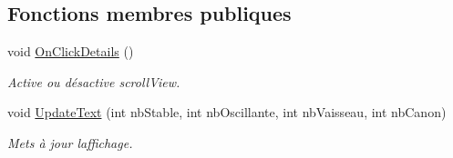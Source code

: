 \subsection*{Fonctions membres publiques}
\begin{DoxyCompactItemize}
\item 
void \mbox{\hyperlink{class_detection_u_i_a1436465c88d6abe37af82424bf3ae11b}{On\+Click\+Details}} ()
\begin{DoxyCompactList}\small\item\em Active ou désactive scroll\+View. \end{DoxyCompactList}\item 
void \mbox{\hyperlink{class_detection_u_i_a1a74833dc3ed95108c3a78bcb3d691be}{Update\+Text}} (int nb\+Stable, int nb\+Oscillante, int nb\+Vaisseau, int nb\+Canon)
\begin{DoxyCompactList}\small\item\em Mets à jour l\textquotesingle{}affichage. \end{DoxyCompactList}\end{DoxyCompactItemize}
